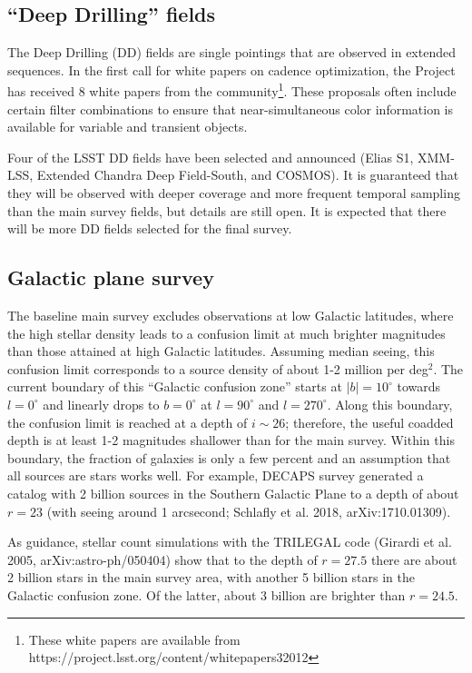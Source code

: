 \documentclass[DM,lsstdraft,toc,usenatbib]{lsstdoc}
\begin{document}
\subsection{``Deep Drilling'' fields} 

The Deep Drilling (DD) fields are single pointings that are observed in extended sequences. 
In the first call for white papers on cadence optimization, the Project has received 
8 white papers from the community\footnote{These white papers are available from 
https://project.lsst.org/content/whitepapers32012}. These proposals often include certain 
filter combinations to ensure that near-simultaneous color information is available for 
variable and transient objects. 

Four of the LSST DD fields have been selected and announced (Elias S1, 
XMM-LSS, Extended Chandra Deep Field-South, and COSMOS). It is guaranteed that they 
will be observed with deeper coverage and more frequent temporal sampling than the main 
survey fields, but details are still open. It is expected that there will be more DD fields 
selected for the final survey. 


\subsection{Galactic plane survey \label{sec:GP}}

The baseline main survey excludes observations at low Galactic latitudes, where the high 
stellar density leads to a confusion limit at much brighter magnitudes than those attained 
at high Galactic latitudes. Assuming median seeing, this confusion limit corresponds to a
source density of about 1-2 million per deg$^2$. The current boundary of this ``Galactic
confusion zone'' starts at $|b|=10^\circ$ towards $l=0^\circ$ and linearly drops to $b=0^\circ$
at $l=90^\circ$ and $l=270^\circ$. Along this boundary, the confusion limit is reached at a
depth of $i \sim 26$; therefore, the useful coadded depth is at least 1-2 magnitudes 
shallower than for the main survey. Within this boundary, the fraction of galaxies is only
a few percent and an assumption that all sources are stars works well. For example, 
DECAPS survey generated a catalog with 2 billion sources in the Southern Galactic Plane
to a depth of about $r=23$ (with seeing around 1 arcsecond; Schlafly et al. 2018, 
arXiv:1710.01309). 

As guidance, stellar count simulations with the TRILEGAL code (Girardi et al. 2005, 
arXiv:astro-ph/050404) show that to the depth of $r=27.5$ there are about 2 billion
stars in the main survey area, with another 5 billion stars in the Galactic confusion 
zone. Of the latter, about 3 billion are brighter than $r=24.5$.  
\end{document}
